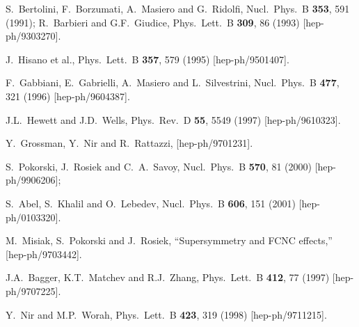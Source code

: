 \documentclass[12pt]{article}
\begin{document}
\begin{thebibliography}{999}
S.~Bertolini, F.~Borzumati, A.~Masiero and G.~Ridolfi,
  Nucl.\ Phys.\ B {\bf 353}, 591 (1991);
R.~Barbieri and G.F.~Giudice,
  Phys.\ Lett.\ B {\bf 309}, 86 (1993)
  [hep-ph/9303270].

J.~Hisano et al., 
  Phys.\ Lett.\ B {\bf 357}, 579 (1995)
  [hep-ph/9501407].

F.~Gabbiani, E.~Gabrielli, A.~Masiero and L.~Silvestrini, 
  Nucl.\ Phys.\ B {\bf 477}, 321 (1996)
  [hep-ph/9604387].

J.L.~Hewett and J.D.~Wells,
  Phys.\ Rev.\ D {\bf 55}, 5549 (1997)
  [hep-ph/9610323].

Y.~Grossman, Y.~Nir and R.~Rattazzi,
  [hep-ph/9701231].

S.~Pokorski, J.~Rosiek and C.~A.~Savoy,
  Nucl.\ Phys.\ B {\bf 570}, 81 (2000)
  [hep-ph/9906206];

S.~Abel, S.~Khalil and O.~Lebedev,
  Nucl.\ Phys.\ B {\bf 606}, 151 (2001)
  [hep-ph/0103320].

  M.~Misiak, S.~Pokorski and J.~Rosiek,
  ``Supersymmetry and FCNC effects,''
  [hep-ph/9703442].

  J.A.~Bagger, K.T.~Matchev and R.J.~Zhang,
  Phys.\ Lett.\ B {\bf 412}, 77 (1997)
  [hep-ph/9707225].

  Y.~Nir and M.P.~Worah,
  Phys.\ Lett.\ B {\bf 423}, 319 (1998)
  [hep-ph/9711215].


\end{thebibliography}
\end{document}
